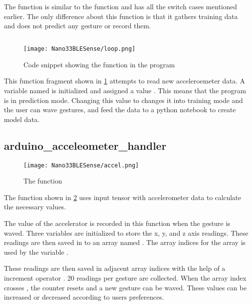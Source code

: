 The function is similar to the function   and has all the switch cases mentioned earlier. The only difference about this function is that it gathers training data and does not predict any gesture or record them.

\subsection{} 

\begin{figure}[h!]
    \texttt{[image: Nano33BLESense/loop.png]}
    \caption{Code snippet showing the function  in the program}
    \label{loop}
\end{figure}

This function fragment shown in \ref{loop} attempts to read new acceleroemeter data. A variable named  is initialized and assigned a value . This means that the program is in prediction mode. Changing this value to  changes it into training mode and the user can wave gestures, and feed the data to a python notebook to create model data. 

\subsection{arduino\_acceleometer\_handler}

\begin{figure}[h!]
    \texttt{[image: Nano33BLESense/accel.png]}
    \caption{The function }
    \label{accel}
\end{figure}

The function shown in \ref{accel}  uses input tensor with accelerometer data to calculate the necessary values. 


The value of the accelerator is recorded in this function when the gesture is waved. Three variables are initialized to store the x, y, and z axis readings. 
These readings are then saved in to an array named . The array indices for the array is used by the variable . 


These readings are then saved in adjacent array indices with the help of a  increment operator \PYTHON{++}. 20 readings per gesture are collected. When the array index crosses , the counter resets and a new gesture can be waved. These values can be increased or decreased according to users preferences. 

